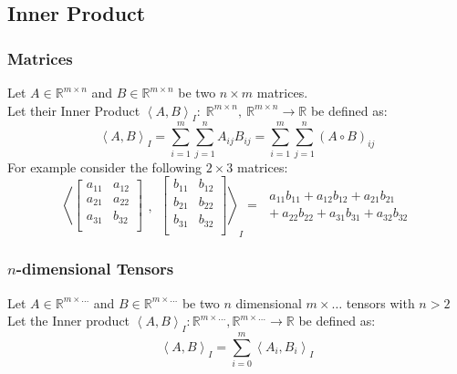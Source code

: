 \documentclass[12pt]{article}
\begin{document}
\subsection{Inner Product}
\subsubsection{Matrices}
Let \(A\in \mathbb{R}^{m \times n}\) and \(B\in \mathbb{R}^{m \times n}\) be two \(n \times m\) matrices. \\Let their Inner Product \(\left<A, B\right>_I:\; \mathbb{R}^{m \times n},~\mathbb{R}^{m \times n} \to \mathbb{R}\) be defined as:
\begin{equation} \label{eq:defs:Inner_product}
\left<A, B\right>_I = \sum_{i=1}^{m}\sum_{j=1}^{n} A_{ij}B_{ij} = \sum_{i=1}^{m}\sum_{j=1}^{n} (A \circ B)_{ij}
\end{equation}
For example consider the following \(2 \times 3\) matrices:
\[
\left<
\begin{bmatrix}
a_{11} & a_{12} \\
a_{21} & a_{22} \\
a_{31} & b_{32} \\
\end{bmatrix}
\begin{matrix} \\\\,\end{matrix}~
\begin{bmatrix}
b_{11} & b_{12} \\
b_{21} & b_{22} \\
b_{31} & b_{32} \\
\end{bmatrix}\right>_I
= \;
\begin{array}{ll}
     a_{11}b_{11} + a_{12}b_{12} + a_{21}b_{21}\\
+~a_{22}b_{22} + a_{31}b_{31} + a_{32}b_{32} 
\end{array}
\]

\subsubsection{\(n\)-dimensional Tensors}
Let \(A \in \mathbb{R}^{m \times \dots}\) and \(B \in \mathbb{R}^{m \times \dots}\) be two \(n\) dimensional \(m \times \dots\) tensors with \(n > 2\)\\
Let the Inner product \(\left<A, B\right>_I : \mathbb{R}^{m \times \dots}, \mathbb{R}^{m \times \dots} \to \mathbb{R}\) be defined as:
\begin{equation}\label{eq:defs:Inner_product_3d}
\left<A, B\right>_I = \sum_{i=0}^{m} \left<A_{i}, B_{i}\right>_I
\end{equation}
\end{document}
